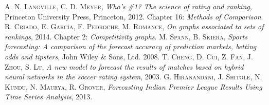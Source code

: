 \documentclass[12pt,a4paper,titlepage]{report}
\begin{document}
\begin{thebibliography}{X}
		 \textsc{A. N. Langville, C. D. Meyer},
		\textit{Who's \#1? The science of rating and ranking}, 
		Princeton University Press, Princeton, 2012. Chapter 16: \textit{Methods of Comparison}.
		 \textsc{R. Criado, E. García, F. Pedroche, M. Romance},
		\textit{On graphs associated to sets of rankings}, 
		2014. Chapter 2: \textit{Competitivity graphs}.
		 \textsc{M. Spann, B. Skiera},
		\textit{Sports forecasting: A comparison of the forecast accuracy of prediction markets, betting odds and tipsters}, 
		John Wiley \& Sons, Ltd. 2008. 
		 \textsc{T. Cheng, D. Cui, Z. Fan, J. Zhou, S. Lu},
		\textit{A new model to forecast the results of matches based on hybrid neural networks in the soccer rating system}, 
		2003. 
		 \textsc{G. Hiranandani, J. Shitole, N. Kundu, N. Maurya, R. Grover},
		\textit{Forecasting Indian Premier League Results Using Time Series Analysis}, 
		2013. 
	\end{thebibliography}

	
	
\end{document}
